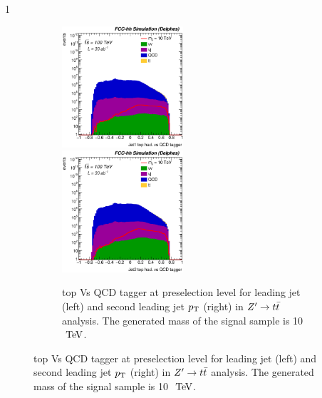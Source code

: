 \documentclass{cernrep}
\begin{document}
1\begin{figure}[!htb]\centering
\begin{figure}[!htb]\centering
\includegraphics[width=0.495\textwidth]{Fig/Zptt/Jet1_thad_vs_QCD_tagger_sel0_nostack_log.eps}
\includegraphics[width=0.495\textwidth]{Fig/Zptt/Jet2_thad_vs_QCD_tagger_sel0_nostack_log.eps}
\caption{top Vs QCD tagger at preselection level for leading jet (left) and second leading jet $p\sb{\scriptstyle\mathrm{T}}$ (right) in $Z^{\prime} \rightarrow t\bar{t}$ analysis. The generated mass of the signal sample is 10 $\TeV$.}
\label{fig:Zptt_sel0_tagger}
\end{figure}


\end{figure}
\end{document}
